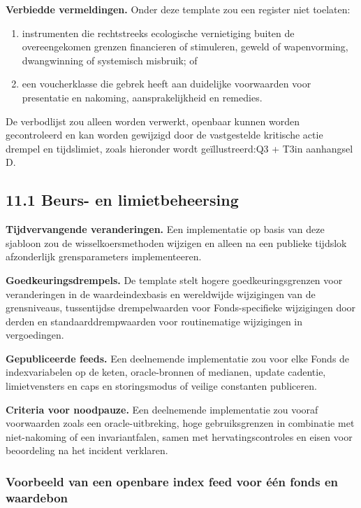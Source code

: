 \documentclass[11pt]{article}
\begin{document}
\textbf{Verbiedde vermeldingen.} Onder deze template zou een register niet toelaten:

\begin{enumerate}[leftmargin=*]
\item instrumenten die rechtstreeks ecologische vernietiging buiten de overeengekomen grenzen financieren of stimuleren, geweld of wapenvorming, dwangwinning of systemisch misbruik; of
\item een voucherklasse die gebrek heeft aan duidelijke voorwaarden voor presentatie en nakoming, aansprakelijkheid en remedies.
\end{enumerate}
De verbodlijst zou alleen worden verwerkt, openbaar kunnen worden gecontroleerd en kan worden gewijzigd door de vastgestelde kritische actie drempel en tijdslimiet, zoals hieronder wordt geïllustreerd:Q3 + T3in aanhangsel D.

\subsection*{11.1 Beurs- en limietbeheersing}

\textbf{Tijdvervangende veranderingen.} Een implementatie op basis van deze sjabloon zou de wisselkoersmethoden wijzigen en alleen na een publieke tijdslok afzonderlijk grensparameters implementeeren.

\textbf{Goedkeuringsdrempels.} De template stelt hogere goedkeuringsgrenzen voor veranderingen in de waardeindexbasis en wereldwijde wijzigingen van de grensniveaus, tussentijdse drempelwaarden voor Fonds-specifieke wijzigingen door derden en standaarddrempwaarden voor routinematige wijzigingen in vergoedingen.

\textbf{Gepubliceerde feeds.} Een deelnemende implementatie zou voor elke Fonds de indexvariabelen op de keten, oracle-bronnen of medianen, update cadentie, limietvensters en caps en storingsmodus of veilige constanten publiceren.

\textbf{Criteria voor noodpauze.} Een deelnemende implementatie zou vooraf voorwaarden zoals een oracle-uitbreking, hoge gebruiksgrenzen in combinatie met niet-nakoming of een invariantfalen, samen met hervatingscontroles en eisen voor beoordeling na het incident verklaren.

\subsubsection*{Voorbeeld van een openbare index feed voor één fonds en waardebon}
\end{document}
